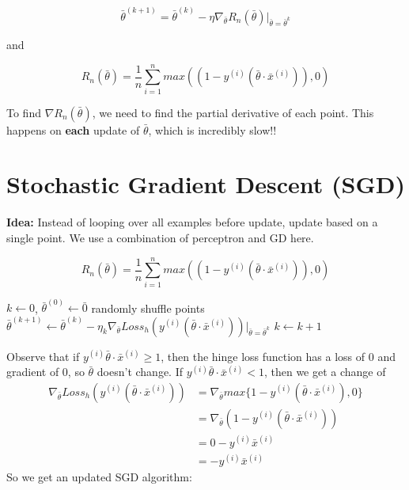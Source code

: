 \documentclass[12pt]{article}
\begin{document}
\[ \bar{\theta}^{(k+1)} = \bar{\theta}^{(k)} - \eta \nabla_{\bar{\theta}}R_n(\bar{\theta}) |_{\bar{\theta} = \bar{\theta}^k}  \]

and 

\[ R_n(\bar{\theta}) = \frac 1 n \sum_{i=1}^n max((1 - y^{(i)}(\bar{\theta} \cdot \bar{x}^{(i)})), 0) \]

To find $\nabla R_n(\bar{\theta})$, we need to find the partial derivative of each point. This happens on \textbf{each} update of $\bar{\theta}$, which is incredibly slow!!

\section{Stochastic Gradient Descent (SGD)}

\textbf{Idea:} Instead of looping over all examples before update, update based on a single point. We use a combination of perceptron and GD here.

\[ R_n(\bar{\theta}) = \frac 1 n \sum_{i=1}^n max((1 - y^{(i)}(\bar{\theta} \cdot \bar{x}^{(i)})), 0) \]

\begin{algorithm}
	\caption{Linear Classification Using Stochastic Gradient Descent}
	\begin{algorithmic}
		\State $k \gets 0$, $\bar{\theta}^{(0)} \gets \bar{0}$
		\State randomly shuffle points
		\State $\bar{\theta}^{(k+1)} \gets \bar{\theta}^{(k)} - \eta_k \nabla_{\bar{\theta}}Loss_h(y^{(i)}(\bar{\theta} \cdot \bar{x}^{(i)}))|_{\bar{\theta} = \bar{\theta}^k}$
		\State $k \gets k + 1$
		\EndFor
		\EndWhile
	\end{algorithmic}
\end{algorithm}

Observe that if $y^{(i)}\bar{\theta} \cdot \bar x^{(i)} \ge 1$, then the hinge loss function has a loss of 0 and gradient of 0, so $\bar{\theta}$ doesn't change. If $y^{(i)}\bar{\theta} \cdot \bar x^{(i)} < 1$, then we get a change of 
\[
	\begin{aligned}
		\nabla_{\bar{\theta}}Loss_h(y^{(i)}(\bar{\theta} \cdot \bar{x}^{(i)})) &= \nabla_{\bar{\theta}}max\{ 1 - y^{(i)}(\bar{\theta} \cdot \bar{x}^{(i)}), 0 \}\\
																																					 &= \nabla_{\bar{\theta}}(1 - y^{(i)}(\bar{\theta} \cdot \bar{x}^{(i)}))\\
																																					 &= 0 - y^{(i)}\bar{x}^{(i)}\\
																																					 &= - y^{(i)}\bar{x}^{(i)} 
	\end{aligned}
\]
So we get an updated SGD algorithm:
\end{document}
